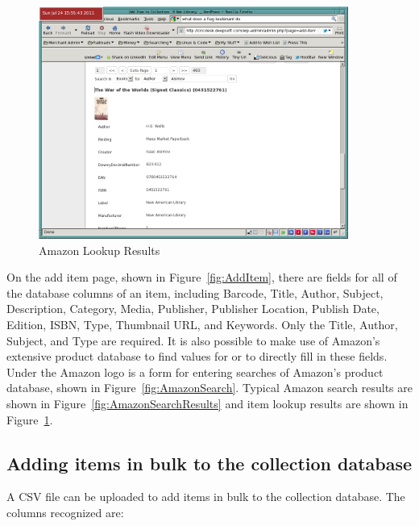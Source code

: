 \documentclass[letterpaper,twoside]{article}
\begin{document}
\begin{figure}[htbp]
\begin{centering}
\includegraphics[width=4in]{AmazonLookupResults.png}  
\caption{Amazon Lookup Results}
\label{fig:AmazonLookupResults}
\end{centering}
\end{figure}
On the add item page, shown in Figure~\ref{fig:AddItem}, there are fields
for all of the database columns of an item, including Barcode, Title,
Author, Subject, Description, Category, Media, Publisher, Publisher
Location, Publish Date, Edition, ISBN, Type, Thumbnail URL, and
Keywords. Only the Title, Author, Subject, and Type are required.  It is
also possible to make use of Amazon's extensive product database to
find values for or to directly fill in these fields.  Under the Amazon
logo is a form for entering searches of Amazon's product database,
shown in Figure~\ref{fig:AmazonSearch}. Typical Amazon search results
are shown in Figure~\ref{fig:AmazonSearchResults} and item lookup
results are shown in Figure~\ref{fig:AmazonLookupResults}.

\clearpage

\subsection{Adding items in bulk to the collection database}

A CSV file can be uploaded to add items in bulk to the collection
database. The columns recognized are:
\end{document}
